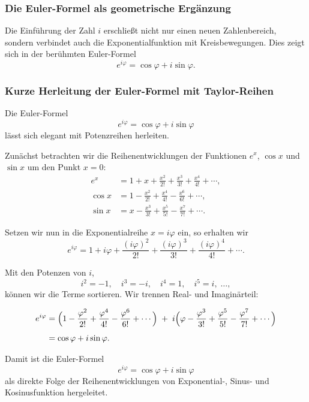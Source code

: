 \subsubsection*{Die Euler-Formel als geometrische Ergänzung}

Die Einführung der Zahl $i$ erschließt nicht nur einen neuen Zahlenbereich,
sondern verbindet auch die Exponentialfunktion mit Kreisbewegungen.
Dies zeigt sich in der berühmten Euler-Formel
\[
e^{i\varphi} = \cos\varphi + i\sin\varphi.
\]

\subsubsection*{Kurze Herleitung der Euler-Formel mit Taylor-Reihen}

Die Euler-Formel
\[
e^{i\varphi} = \cos\varphi + i\sin\varphi
\]
lässt sich elegant mit Potenzreihen herleiten.

Zunächst betrachten wir die Reihenentwicklungen der Funktionen
$e^x$, $\cos x$ und $\sin x$ um den Punkt $x=0$:
\begin{align*}
	e^x &= 1 + x + \frac{x^2}{2!} + \frac{x^3}{3!} + \frac{x^4}{4!} + \cdots,\\[1ex]
	\cos x &= 1 - \frac{x^2}{2!} + \frac{x^4}{4!} - \frac{x^6}{6!} + \cdots,\\[1ex]
	\sin x &= x - \frac{x^3}{3!} + \frac{x^5}{5!} - \frac{x^7}{7!} + \cdots.
\end{align*}

Setzen wir nun in die Exponentialreihe $x = i\varphi$ ein, so erhalten wir
\[
e^{i\varphi} = 1 + i\varphi + \frac{(i\varphi)^2}{2!}
+ \frac{(i\varphi)^3}{3!}
+ \frac{(i\varphi)^4}{4!}
+ \cdots.
\]

Mit den Potenzen von $i$,
\[
i^2 = -1,\quad i^3 = -i,\quad i^4 = 1,\quad i^5 = i,\;\dots,
\]
können wir die Terme sortieren. Wir trennen Real- und Imaginärteil:

\begin{align*}
	e^{i\varphi}
	&= \Bigl(1 - \frac{\varphi^2}{2!} + \frac{\varphi^4}{4!} - \frac{\varphi^6}{6!} + \cdots\Bigr)
	\;+\; i\Bigl(\varphi - \frac{\varphi^3}{3!} + \frac{\varphi^5}{5!} - \frac{\varphi^7}{7!} + \cdots\Bigr)\\[1ex]
	&= \cos\varphi + i\sin\varphi.
\end{align*}

Damit ist die Euler-Formel
\[
e^{i\varphi} = \cos\varphi + i\sin\varphi
\]
als direkte Folge der Reihenentwicklungen von Exponential-, Sinus-
und Kosinusfunktion hergeleitet.

